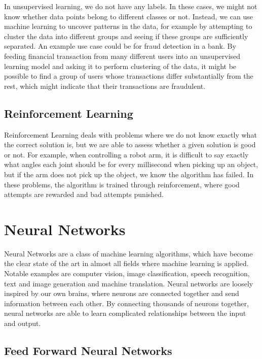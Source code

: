 \documentclass[UKenglish]{uiomasterthesis} %
\theoremstyle{definition}
\begin{document}
In unsupervised learning, we do not have any labels. In these cases, we might not know whether data points belong to different classes or not. Instead, we can use machine learning to uncover patterns in the data, for example by attempting to cluster the data into different groups and seeing if these groups are sufficiently separated. An example use case could be for fraud detection in a bank. By feeding financial transaction from many different users into an unsupervised learning model and asking it to perform clustering of the data, it might be possible to find a group of users whose transactions differ substantially from the rest, which might indicate that their transactions are fraudulent.

\subsection{Reinforcement Learning}

Reinforcement Learning deals with problems where we do not know exactly what the correct solution is, but we are able to assess whether a given solution is good or not. For example, when controlling a robot arm, it is difficult to say exactly what angles each joint should be for every millisecond when picking up an object, but if the arm does not pick up the object, we know the algorithm has failed. In these problems, the algorithm is trained through reinforcement, where good attempts are rewarded and bad attempts punished.

\section{Neural Networks}

Neural Networks are a class of machine learning algorithms, which have become the clear state of the art in almost all fields where machine learning is applied. Notable examples are computer vision, image classification, speech recognition, text and image generation and machine translation. Neural networks are loosely inspired by our own brains, where neurons are connected together and send information between each other. By connecting thousands of neurons together, neural networks are able to learn complicated relationships between the input and output.

\subsection{Feed Forward Neural Networks}
\end{document}
